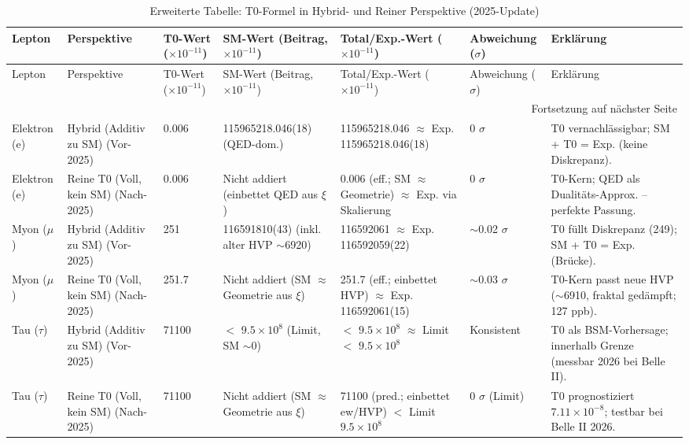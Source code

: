 \documentclass[12pt,a4paper]{article}
\begin{document}
	\begin{longtable}{p{1.8cm}p{2cm}p{1.2cm}p{3cm}p{3cm}p{1.8cm}p{2.5cm}}
		\caption{Erweiterte Tabelle: T0-Formel in Hybrid- und Reiner Perspektive (2025-Update)} \label{tab:extended_comparison}\\
		\toprule
		Lepton & Perspektive & T0-Wert ($ \times 10^{-11}$) & SM-Wert (Beitrag, $ \times 10^{-11}$) & Total/Exp.-Wert ($ \times 10^{-11}$) & Abweichung ($\sigma$) & Erklärung \\
		\midrule
		\endfirsthead
		
		\toprule
		Lepton & Perspektive & T0-Wert ($ \times 10^{-11}$) & SM-Wert (Beitrag, $ \times 10^{-11}$) & Total/Exp.-Wert ($ \times 10^{-11}$) & Abweichung ($\sigma$) & Erklärung \\
		\midrule
		\endhead
		
		\bottomrule
		\multicolumn{7}{r}{Fortsetzung auf nächster Seite} \\
		\endfoot
		
		Elektron (e) & Hybrid (Additiv zu SM) (Vor-2025) & 0.006 & 115965218.046(18) (QED-dom.) & 115965218.046 $\approx$ Exp. 115965218.046(18) & 0 $\sigma$ & T0 vernachlässigbar; SM + T0 = Exp. (keine Diskrepanz). \\
		Elektron (e) & Reine T0 (Voll, kein SM) (Nach-2025) & 0.006 & Nicht addiert (einbettet QED aus $\xi$) & 0.006 (eff.; SM $\approx$ Geometrie) $\approx$ Exp. via Skalierung & 0 $\sigma$ & T0-Kern; QED als Dualitäts-Approx. -- perfekte Passung. \\
		Myon ($\mu$) & Hybrid (Additiv zu SM) (Vor-2025) & 251 & 116591810(43) (inkl. alter HVP $\sim$6920) & 116592061 $\approx$ Exp. 116592059(22) & $\sim$0.02 $\sigma$ & T0 füllt Diskrepanz (249); SM + T0 = Exp. (Brücke). \\
		Myon ($\mu$) & Reine T0 (Voll, kein SM) (Nach-2025) & 251.7 & Nicht addiert (SM $\approx$ Geometrie aus $\xi$) & 251.7 (eff.; einbettet HVP) $\approx$ Exp. 116592061(15) & $\sim$0.03 $\sigma$ & T0-Kern passt neue HVP ($\sim$6910, fraktal gedämpft; 127 ppb). \\
		Tau ($\tau$) & Hybrid (Additiv zu SM) (Vor-2025) & 71100 & $<$ $9.5 \times 10^{8}$ (Limit, SM $\sim$0) & $<$ $9.5 \times 10^{8}$ $\approx$ Limit $<$ $9.5 \times 10^{8}$ & Konsistent & T0 als BSM-Vorhersage; innerhalb Grenze (messbar 2026 bei Belle II). \\
		Tau ($\tau$) & Reine T0 (Voll, kein SM) (Nach-2025) & 71100 & Nicht addiert (SM $\approx$ Geometrie aus $\xi$) & 71100 (pred.; einbettet ew/HVP) $<$ Limit $9.5 \times 10^{8}$ & 0 $\sigma$ (Limit) & T0 prognostiziert $7.11 \times 10^{-8}$; testbar bei Belle II 2026. \\
	\end{longtable}
	
\end{document}
